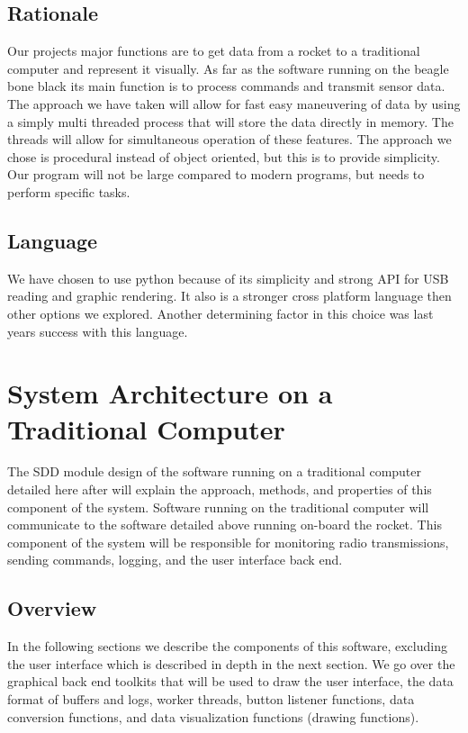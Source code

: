 \documentclass[10pt,draftclsnofoot,onecolumn,retainorgcmds]{IEEEtran}
\begin{document}
\subsection{Rationale}
Our projects major functions are to get data from a rocket to a traditional computer and represent it visually. As far as the software running on the beagle bone black its main function is to process commands and transmit sensor data. The approach we have taken will allow for fast easy maneuvering of data by using a simply multi threaded process that will store the data directly in memory. The threads will allow for simultaneous operation of these features. The approach we chose is procedural instead of object oriented, but this is to provide simplicity. Our program will not be large compared to modern programs, but needs to perform specific tasks.
\subsection{Language}
We have chosen to use python because of its simplicity and strong API for USB reading and graphic rendering. It also is a stronger cross platform language then other options we explored. Another determining factor in this choice was last years success with this language.

\section{System Architecture on a Traditional Computer }
The SDD module design of the software running on a traditional computer detailed here after will explain the approach, methods, and properties of this component of the system. Software running on the traditional computer will communicate to the software detailed above running on-board the rocket. This component of the system will be responsible for monitoring radio transmissions, sending commands, logging, and the user interface back end. \par

\subsection{Overview}
In the following sections we describe the components of this software, excluding the user interface which is described in depth in the next section. We go over the graphical back end toolkits that will be used to draw the user interface, the data format of buffers and logs, worker threads, button listener functions, data conversion functions, and data visualization functions (drawing functions). \par
\end{document}

